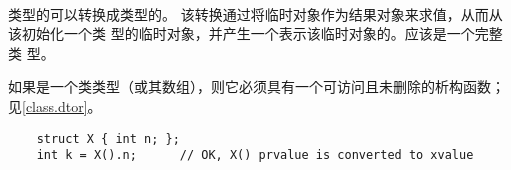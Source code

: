 \paragraph{} %
类型的\prvalue{}可以转换成类型的\xvalue{}。
该转换通过将临时对象作为结果对象来求值\prvalue{}，从而从该\prvalue{}初始化一个类
型的临时对象，并产生一个表示该临时对象的\xvalue{}。应该是一个完整类
型。

\begin{note}
  如果是一个类类型（或其数组），则它必须具有一个可访问且未删除的析构函数；
  见\ref{class.dtor}。
\end{note}

\begin{example}
  \begin{lstlisting}
    struct X { int n; };
    int k = X().n;      // OK, X() prvalue is converted to xvalue
  \end{lstlisting}
\end{example}
